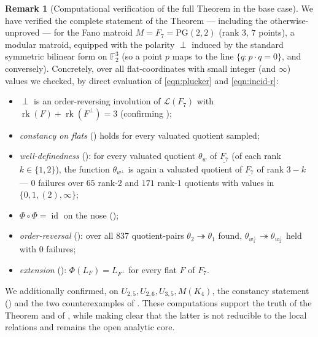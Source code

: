 \documentclass{article}
\theoremstyle{definition}
\newtheorem{remark}[theorem]{Remark}
\newcommand{\rk}{\operatorname{rk}}
\newcommand{\onto}{\twoheadrightarrow}
\newcommand{\cLL}{\mathcal{L}}
\begin{document}
\begin{remark}[Computational verification of the full Theorem in the base case]\label{rmk:numeric}
We have verified the complete statement of the Theorem --- including the otherwise-unproved
 --- for the Fano matroid $M=F_7=\mathrm{PG}(2,2)$ (rank $3$, $7$ points), a
modular matroid, equipped with the polarity $\perp$ induced by the standard symmetric bilinear form
on $\mathbb F_2^3$ (so a point $p$ maps to the line $\{q:p\cdot q=0\}$, and conversely). Concretely,
over all flat-coordinates with small integer (and $\infty$) values we checked, by direct evaluation
of \eqref{eqn:plucker} and \eqref{eqn:incid-r}:
\begin{itemize}
\item $\perp$ is an order-reversing involution of $\cLL(F_7)$ with $\rk(F)+\rk(F^{\perp})=3$
(confirming );
\item \emph{constancy on flats} () holds for every valuated quotient sampled;
\item \emph{well-definedness} (): for every valuated quotient $\theta_w$ of
$\underline{F_7}$ (of each rank $k\in\{1,2\}$), the function $\theta_{w^{\perp}}$ is again a valuated
quotient of $\underline{F_7}$ of rank $3-k$ --- $0$ failures over $65$ rank-$2$ and $171$ rank-$1$
quotients with values in $\{0,1,(2),\infty\}$;
\item $\Phi\circ\Phi=\operatorname{id}$ on the nose ();
\item \emph{order-reversal} (): over all $837$ quotient-pairs $\theta_2\onto\theta_1$
found, $\theta_{w_1^{\perp}}\onto\theta_{w_2^{\perp}}$ held with $0$ failures;
\item \emph{extension} (): $\Phi(L_F)=L_{F^{\perp}}$ for every flat $F$ of $F_7$.
\end{itemize}
We additionally confirmed, on $U_{2,5},U_{2,6},U_{3,5},M(K_4)$, the constancy statement
() and the two counterexamples of . These computations
support the truth of the Theorem and of , while making clear that the latter
is not reducible to the local relations and remains the open analytic core.
\end{remark}
\end{document}
